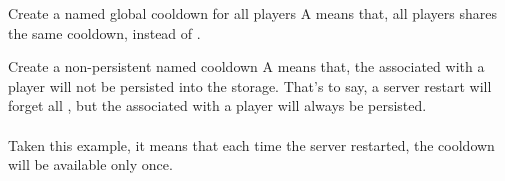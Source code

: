 \begin{example}{Create a named global cooldown for all players}
    A  means that, all players shares the same cooldown, instead of .\\
\end{example}

\begin{example}{Create a non-persistent named cooldown}
    A  means that, the  associated with a player will not be persisted into the storage.
    That's to say, a server restart will forget all , but the  associated with a player will always be persisted.\\
    \\
    Taken this example, it means that each time the server restarted, the cooldown will be available only once.
\end{example}
